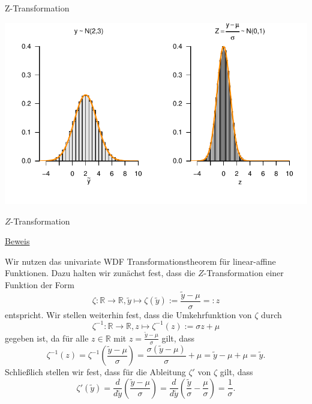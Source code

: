 \documentclass[
  8pt,
  ignorenonframetext,
]{beamer}
\begin{document}
\begin{frame}{Z-Transformation}
\protect\hypertarget{z-transformation-3}{}
\vfill
\vspace{5mm}

\begin{center}\includegraphics[width=1\linewidth]{8_Abbildungen/wtfi_8_z_transformation} \end{center}
\vfill
\end{frame}

\begin{frame}{\(Z\)-Transformation}
\protect\hypertarget{z-transformation-4}{}
\footnotesize

\underline{Beweis} \vspace{2mm}

Wir nutzen das univariate WDF Transformationstheorem für linear-affine
Funktionen. Dazu halten wir zunächst fest, dass die \(Z\)-Transformation
einer Funktion der Form \begin{equation}
\zeta : \mathbb{R} \to \mathbb{R}, \tilde{y} \mapsto \zeta(\tilde{y}) := \frac{\tilde{y} - \mu}{\sigma} =: z
\end{equation} entspricht. Wir stellen weiterhin fest, dass die
Umkehrfunktion von \(\zeta\) durch \begin{equation}
\zeta^{-1} : \mathbb{R} \to \mathbb{R}, z \mapsto \zeta^{-1}(z) := \sigma z + \mu
\end{equation} gegeben ist, da für alle \(z \in \mathbb{R}\) mit
\(z = \frac{\tilde{y} - \mu}{\sigma}\) gilt, dass \begin{equation}
\zeta^{-1}(z)
= \zeta^{-1}\left(\frac{\tilde{y} - \mu}{\sigma}\right)
= \frac{\sigma(\tilde{y} - \mu)}{\sigma} + \mu
= \tilde{y} - \mu + \mu
= \tilde{y}.
\end{equation} Schließlich stellen wir fest, dass für die Ableitung
\(\zeta'\) von \(\zeta\) gilt, dass \begin{equation}
\zeta'(\tilde{y})
= \frac{d}{d\tilde{y}}\left(\frac{\tilde{y} - \mu}{\sigma} \right)
= \frac{d}{d\tilde{y}}\left(\frac{\tilde{y}}{\sigma} -\frac{\mu}{\sigma} \right)
= \frac{1}{\sigma}.
\end{equation}
\end{frame}
\end{document}
